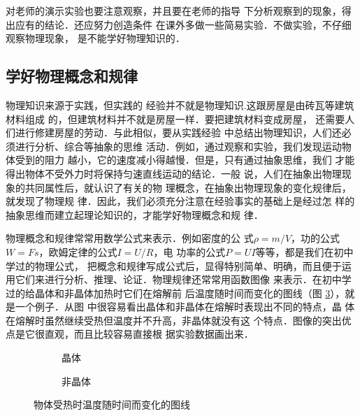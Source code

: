     对老师的演示实验也要注意观察，并且要在老师的指导
下分析观察到的现象，得出应有的结论．还应努力创造条件
在课外多做一些简易实验．不做实验，不仔细观察物理现象，
是不能学好物理知识的．

\subsection*{学好物理概念和规律}

物理知识来源于实践，但实践的
经验并不就是物理知识.这跟房屋是由砖瓦等建筑材料组成
的，但建筑材料并不就是房屋一样．要把建筑材料变成房屋，
还需要人们进行修建房屋的劳动．与此相似，要从实践经验
中总结出物理知识，人们还必须进行分析、综合等抽象的思维
活动．例如，通过观察和实验，我们发现运动物体受到的阻力
越小，它的速度减小得越慢．但是，只有通过抽象思维，我们
才能得出物体不受外力时将保持匀速直线运动的结论．一般
说，人们在抽象出物理现象的共同属性后，就认识了有关的物
理概念，在抽象出物理现象的变化规律后，就发现了物理规
律．因此，我们必须充分注意在经验事实的基础上是经过怎
样的抽象思维而建立起理论知识的，才能学好物理概念和规
律．

物理概念和规律常常用数学公式来表示．例如密度的公
式$\rho=m/V$，功的公式$W=Fs$，欧姆定律的公式$I=U/R$，电
功率的公式$P=UI$等等，都是我们在初中学过的物理公式，
把概念和规律写成公式后，显得特别简单、明确，而且便于运
用它们来进行分析、推理、论证．物理规律还常常用函数图像
来表示．在初中学过的给晶体和非晶体加热时它们在熔解前
后温度随时间而变化的图线（图 \ref{fig_A_0-1}），就是一个例子．从图
中很容易看出晶体和非晶体在熔解时表现出不同的特点，晶
体在熔解时虽然继续受热但温度并不升高，非晶体就没有这
个特点．图像的突出优点是它很直观，而且比较容易直接根
据实验数据画出来．

\begin{figure}[htbp]
    \centering 
    \begin{subfigure}{0.46\linewidth}
        \centering
        \caption{晶体}\label{fig_A_0-1a}
    \end{subfigure}
    \hfil
    \begin{subfigure}{0.46\linewidth}
        \centering
        \caption{非晶体}\label{fig_A_0-1b}
    \end{subfigure}
    \caption{物体受热时温度随时间而变化的图线}\label{fig_A_0-1}
\end{figure}

